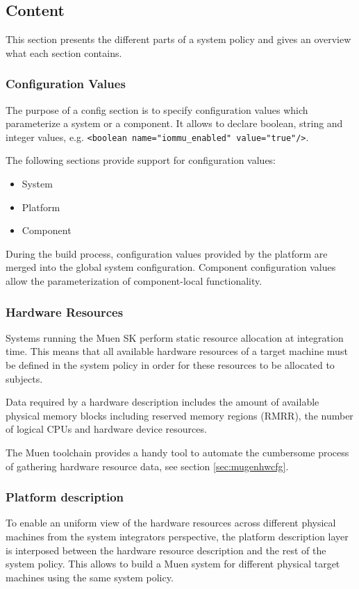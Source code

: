 \documentclass[a4paper,twoside,titlepage]{article}
\begin{document}
\subsection{Content}
This section presents the different parts of a system policy and gives an
overview what each section contains.

\subsubsection{Configuration Values}
The purpose of a config section is to specify configuration values which
parameterize a system or a component. It allows to declare boolean, string and
integer values, e.g. \texttt{<boolean name="iommu\_enabled" value="true"/>}.

The following sections provide support for configuration values:
\begin{itemize}
	\item System
	\item Platform
	\item Component
\end{itemize}

During the build process, configuration values provided by the platform are
merged into the global system configuration. Component configuration values
allow the parameterization of component-local functionality.

\subsubsection{Hardware Resources}
Systems running the Muen SK perform static resource allocation at integration
time. This means that all available hardware resources of a target machine must
be defined in the system policy in order for these resources to be allocated to
subjects.

Data required by a hardware description includes the amount of available
physical memory blocks including reserved memory regions (RMRR), the number of
logical CPUs and hardware device resources.

The Muen toolchain provides a handy tool to automate the cumbersome process of
gathering hardware resource data, see section \ref{sec:mugenhwcfg}.

\subsubsection{Platform description}
To enable an uniform view of the hardware resources across different physical
machines from the system integrators perspective, the platform description layer
is interposed between the hardware resource description and the rest of the
system policy. This allows to build a Muen system for different physical target
machines using the same system policy.
\end{document}
